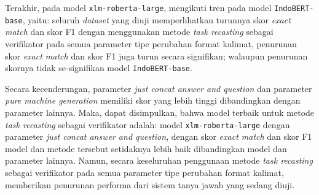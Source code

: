 Terakhir, pada model \texttt{xlm-roberta-large}, mengikuti tren pada model \texttt{IndoBERT-base}, yaitu: seluruh \emph{dataset} yang diuji memperlihatkan turunnya skor \emph{exact match} dan skor F1 dengan menggunakan metode \emph{task recasting} sebagai verifikator pada semua parameter tipe perubahan format kalimat, penurunan skor \emph{exact match} dan skor F1 juga turun secara signifikan; walaupun penurunan skornya tidak se-signifikan model \texttt{IndoBERT-base}.

Secara kecenderungan, parameter \emph{just concat answer and question} dan parameter \emph{pure machine generation} memiliki skor yang lebih tinggi dibandingkan dengan parameter lainnya. Maka, dapat disimpulkan, bahwa model terbaik untuk metode \emph{task recasting} sebagai verifikator adalah: model \texttt{xlm-roberta-large} dengan parameter \emph{just concat answer and question}, dengan skor \emph{exact match} dan skor F1 model dan metode tersebut setidaknya lebih baik dibandingkan model dan parameter lainnya. Namun, secara keseluruhan penggunaan metode \emph{task recasting} sebagai verifikator pada semua parameter tipe perubahan format kalimat, memberikan penurunan performa dari sistem tanya jawab yang sedang diuji. 

